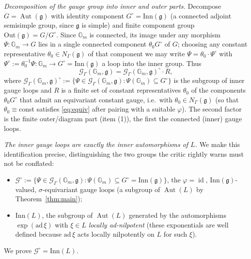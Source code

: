 \documentclass{amsart}
\theoremstyle{definition}
\DeclareMathOperator{\Aut}{Aut}
\DeclareMathOperator{\id}{id}
\newcommand{\Gm}{\mathbb{G}_m}
\newcommand{\g}{\mathfrak{g}}
\begin{document}
\emph{Decomposition of the gauge group into inner and outer parts.}
Decompose $G=\Aut(\g)$ with identity component $G^\circ=\mathrm{Inn}(\g)$
(a connected adjoint semisimple group, since $\g$ is simple) and finite
component group $\mathrm{Out}(\g)=G/G^\circ$.  Since $\Gm$ is connected,
its image under any morphism $\Psi\colon\Gm\to G$ lies in a single
connected component $\theta_0 G^\circ$ of $G$; choosing any constant
representative $\theta_0\in N_\Gamma(\g)$ of that component we may write
$\Psi=\theta_0\cdot\Psi^\circ$ with $\Psi^\circ:=\theta_0^{-1}\Psi\colon
\Gm\to G^\circ=\mathrm{Inn}(\g)$ a loop into the inner group.  Thus
\begin{equation}\label{eq:gaugesplit}
\mathcal G_\Gamma(\Gm,\g)=
\mathcal G_\Gamma(\Gm,\g)^\circ\cdot R,
\end{equation}
where $\mathcal G_\Gamma(\Gm,\g)^\circ:=\{\Psi\in\mathcal G_\Gamma(\Gm,\g):
\Psi(\Gm)\subseteq G^\circ\}$ is the subgroup of inner gauge loops and $R$
is a finite set of constant representatives $\theta_0$ of the components
$\theta_0 G^\circ$ that admit an equivariant constant gauge, i.e.\ with
$\theta_0\in N_\Gamma(\g)$ (so that $\theta_0\equiv$const satisfies
\eqref{eq:equiv} after pairing with a suitable $\varphi$).  The second
factor is the finite outer/diagram part (item (1)), the first the
connected (inner) gauge loops.

\emph{The inner gauge loops are exactly the inner automorphisms of $L$.}
We make this identification precise, distinguishing the two groups the
critic rightly warns must not be conflated:
\begin{itemize}
\item $\mathcal G^\circ:=\{\Psi\in\mathcal G_\Gamma(\Gm,\g):
\Psi(\Gm)\subseteq G^\circ=\mathrm{Inn}(\g)\}$, the $\varphi=\id$,
$\mathrm{Inn}(\g)$-valued, $\sigma$-equivariant gauge loops (a subgroup of
$\Aut(L)$ by Theorem~\ref{thm:main});
\item $\mathrm{Inn}(L)$, the subgroup of $\Aut(L)$ generated by the
automorphisms $\exp(\mathrm{ad}\,\xi)$ with $\xi\in L$ \emph{locally
ad-nilpotent} (these exponentials are well defined because $\mathrm{ad}\,
\xi$ acts locally nilpotently on $L$ for such $\xi$).
\end{itemize}
We prove $\mathcal G^\circ=\mathrm{Inn}(L)$.
\end{document}
